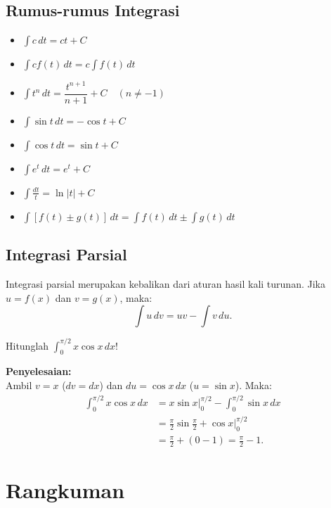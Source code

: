 \subsection{Rumus-rumus Integrasi}

\begin{itemize}
\item $\displaystyle\int c\,dt = ct + C$
\item $\displaystyle\int cf(t)\,dt = c\int f(t)\,dt$
\item $\displaystyle\int t^n\,dt = \dfrac{t^{n+1}}{n+1} + C \quad (n \ne -1)$
\item $\displaystyle\int \sin t\,dt = -\cos t + C$
\item $\displaystyle\int \cos t\,dt = \sin t + C$
\item $\displaystyle\int e^t\,dt = e^t + C$
\item $\displaystyle\int \frac{dt}{t} = \ln|t| + C$
\item $\displaystyle\int [f(t) \pm g(t)]\,dt = \int f(t)\,dt \pm \int g(t)\,dt$
\end{itemize}

\subsection{Integrasi Parsial}

Integrasi parsial merupakan kebalikan dari aturan hasil kali turunan. Jika $u = f(x)$ dan $v = g(x)$, maka:
\begin{equation}
\int u\,dv = uv - \int v\,du.
\end{equation}

\begin{exmp}
Hitunglah $\displaystyle\int_0^{\pi/2} x\cos x\,dx$!

\textbf{Penyelesaian:}\\
Ambil $v = x$ ($dv = dx$) dan $du = \cos x\,dx$ ($u = \sin x$). Maka:
\begin{align*}
\int_0^{\pi/2} x\cos x\,dx &= x\sin x\Big|_0^{\pi/2} - \int_0^{\pi/2}\sin x\,dx \\
&= \frac{\pi}{2}\sin\frac{\pi}{2} + \cos x\Big|_0^{\pi/2} \\
&= \frac{\pi}{2} + (0 - 1) = \frac{\pi}{2} - 1.
\end{align*}
\end{exmp}

\section*{Rangkuman}

